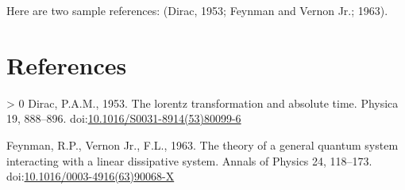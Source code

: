 \documentclass[]{elsarticle} %
\newlength{\cslhangindent}
\newenvironment{CSLReferences}[3] %
 {%
  \setlength{\parindent}{0pt}
  \ifodd #1 \everypar{\setlength{\hangindent}{\cslhangindent}}\ignorespaces\fi
  \ifnum #2 > 0
  \setlength{\parskip}{#2\baselineskip}
  \fi
 }%
 {}
\begin{document}
Here are two sample references: (Dirac, 1953; Feynman and Vernon Jr.;
1963).

\hypertarget{references}{%
\section*{References}\label{references}}

\hypertarget{refs}{}
\begin{CSLReferences}{1}{0}
\leavevmode\hypertarget{ref-Dirac1953888}{}%
Dirac, P.A.M., 1953. The lorentz transformation and absolute time.
Physica 19, 888--896.
doi:\href{https://doi.org/10.1016/S0031-8914(53)80099-6}{10.1016/S0031-8914(53)80099-6}

\leavevmode\hypertarget{ref-Feynman1963118}{}%
Feynman, R.P., Vernon Jr., F.L., 1963. The theory of a general quantum
system interacting with a linear dissipative system. Annals of Physics
24, 118--173.
doi:\href{https://doi.org/10.1016/0003-4916(63)90068-X}{10.1016/0003-4916(63)90068-X}

\end{CSLReferences}
\end{document}
